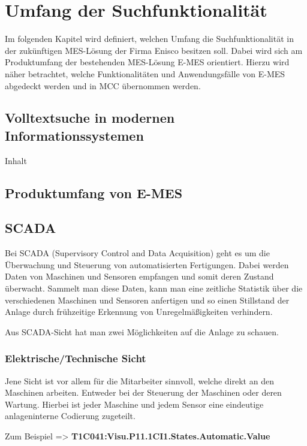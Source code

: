 \chapter{Umfang der Suchfunktionalität\label{chap3:Drittes-Kapitel}}

Im folgenden Kapitel wird definiert, welchen Umfang die Suchfunktionalität in der zukünftigen MES-Lösung der Firma Enisco besitzen soll. Dabei wird sich am Produktumfang der bestehenden MES-Lösung E-MES orientiert. Hierzu wird näher betrachtet, welche Funktionalitäten und Anwendungsfälle von E-MES abgedeckt werden und in MCC übernommen werden.

\section{Volltextsuche in modernen Informationssystemen\label{sec2.3:Unterpunkt-3}}

Inhalt

\section{Produktumfang von E-MES\label{sec3.1:unterpunkt-1}}

\section{SCADA\label{sec3.2:unterpunkt-2}}
Bei SCADA (Supervisory Control and Data Acquisition) geht es um die Überwachung und Steuerung von automatisierten Fertigungen. Dabei werden Daten von Maschinen und Sensoren empfangen und somit deren Zustand überwacht. Sammelt man diese Daten, kann man eine zeitliche Statistik über die verschiedenen Maschinen und Sensoren anfertigen und so einen Stillstand der Anlage durch frühzeitige Erkennung von Unregelmäßigkeiten verhindern.

Aus SCADA-Sicht hat man zwei Möglichkeiten auf die Anlage zu schauen.

\subsection{Elektrische/Technische Sicht\label{subsec3.2.1:Unterunterpunkt-1}}
Jene Sicht ist vor allem für die Mitarbeiter sinnvoll, welche direkt an den Maschinen arbeiten. Entweder bei der Steuerung der Maschinen oder deren Wartung. Hierbei ist jeder Maschine und jedem Sensor eine eindeutige anlageninterne Codierung zugeteilt.

Zum Beispiel => \textbf{T1C041:Visu.P11.1CI1.States.Automatic.Value}

